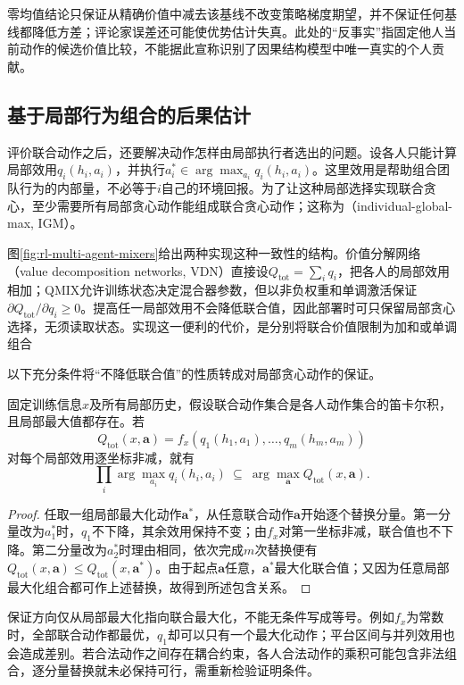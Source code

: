 零均值结论只保证从精确价值中减去该基线不改变策略梯度期望，并不保证任何基线都降低方差；评论家误差还可能使优势估计失真。此处的“反事实”指固定他人当前动作的候选价值比较，不能据此宣称识别了因果结构模型中唯一真实的个人贡献。

\subsection{基于局部行为组合的后果估计}
\label{sec:rl-multi-agent-factorization}

评价联合动作之后，还要解决动作怎样由局部执行者选出的问题。设各人只能计算局部效用$q_i(h_i,a_i)$，并执行$a_i^*\in\arg\max_{a_i}q_i(h_i,a_i)$。这里效用是帮助组合团队行为的内部量，不必等于$i$自己的环境回报。为了让这种局部选择实现联合贪心，至少需要所有局部贪心动作能组成联合贪心动作；这称为（individual-global-max, IGM）。

图\ref{fig:rl-multi-agent-mixers}给出两种实现这种一致性的结构。价值分解网络（value decomposition networks, VDN）直接设$Q_{\text{tot}}=\sum_i q_i$，把各人的局部效用相加；QMIX允许训练状态决定混合器参数，但以非负权重和单调激活保证$\partial Q_{\text{tot}}/\partial q_i\geq0$。提高任一局部效用不会降低联合值，因此部署时可只保留局部贪心选择，无须读取状态。实现这一便利的代价，是分别将联合价值限制为加和或单调组合

以下充分条件将“不降低联合值”的性质转成对局部贪心动作的保证。

\begin{theorem}[单调组合的局部贪心充分性]
\label{thm:rl-multi-agent-monotone}
固定训练信息$x$及所有局部历史，假设联合动作集合是各人动作集合的笛卡尔积，且局部最大值都存在。若
\[
 Q_{\text{tot}}(x,\bm a)
 =f_x(q_1(h_1,a_1),\ldots,q_m(h_m,a_m))
\]
对每个局部效用逐坐标非减，就有
\[
 \prod_i\arg\max_{a_i}q_i(h_i,a_i)
 \ \subseteq\ \arg\max_{\bm a}Q_{\text{tot}}(x,\bm a).
\]
\end{theorem}
\begin{proof}
任取一组局部最大化动作$\bm a^*$，从任意联合动作$\bm a$开始逐个替换分量。第一分量改为$a_1^*$时，$q_1$不下降，其余效用保持不变；由$f_x$对第一坐标非减，联合值也不下降。第二分量改为$a_2^*$时理由相同，依次完成$m$次替换便有
$Q_{\text{tot}}(x,\bm a)\leq Q_{\text{tot}}(x,\bm a^*)$。由于起点$\bm a$任意，$\bm a^*$最大化联合值；又因为任意局部最大化组合都可作上述替换，故得到所述包含关系。
\end{proof}

保证方向仅从局部最大化指向联合最大化，不能无条件写成等号。例如$f_x$为常数时，全部联合动作都最优，$q_1$却可以只有一个最大化动作；平台区间与并列效用也会造成差别。若合法动作之间存在耦合约束，各人合法动作的乘积可能包含非法组合，逐分量替换就未必保持可行，需重新检验证明条件。

